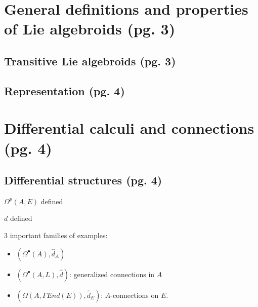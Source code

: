 \documentclass{article}
\begin{document}
\section{General definitions and properties of Lie algebroids (pg. 3)}

\subsection{Transitive Lie algebroids (pg. 3)}

\subsection{Representation (pg. 4)}


\section{Differential calculi and connections (pg. 4)}

\subsection{Differential structures (pg. 4)}

$\Omega^p(A, E)$ defined

$d$ defined

3 important families of examples:

    \begin{itemize}
        
    \item $(\Omega^\bullet(A), \hat d_A)$
    
    \item $(\Omega^\bullet(A, L), \hat d)$: generalized connections in $A$
    
    \item $(\Omega(A, \Gamma End(E)), \hat d_E)$: $A$-connections on $E$.
        
    \end{itemize}
\end{document}

